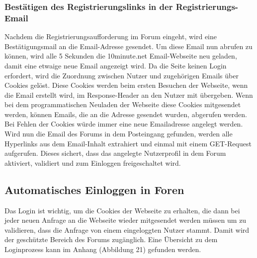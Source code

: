 \subsubsection{Bestätigen des Registrierungslinks in der Registrierungs-Email}
Nachdem die Registrierungsaufforderung im Forum eingeht, wird eine Bestätigungsmail an die Email-Adresse gesendet.
Um diese Email nun abrufen zu können, wird alle 5 Sekunden die 10minute.net Email-Webseite neu geladen, damit eine etwaige neue Email angezeigt wird. Da die Seite keinen Login erfordert, wird die Zuordnung zwischen Nutzer und zugehörigen Emails über Cookies gelöst. Diese Cookies werden beim ersten Besuchen der Webseite, wenn die Email erstellt wird, im Response-Header an den Nutzer mit übergeben. Wenn bei dem programmatischen Neuladen der Webseite diese Cookies mitgesendet werden, können Emails, die an die Adresse gesendet wurden, abgerufen werden. Bei Fehlen der Cookies würde immer eine neue Emailadresse angelegt werden.\\
Wird nun die Email des Forums in dem Posteingang gefunden, werden alle Hyperlinks aus dem Email-Inhalt extrahiert und einmal mit einem GET-Request aufgerufen. Dieses sichert, dass das angelegte Nutzerprofil in dem Forum aktiviert, validiert und zum Einloggen freigeschaltet wird.


\subsection {Automatisches Einloggen in Foren}
Das Login ist wichtig, um die Cookies der Webseite zu erhalten, die dann bei jeder neuen Anfrage an die Webseite wieder mitgesendet werden müssen um zu validieren, dass die Anfrage von einem eingeloggten Nutzer stammt. Damit wird der geschützte Bereich des Forums zugänglich.
Eine Übersicht zu dem Loginprozess kann im Anhang (Abbildung 21) gefunden werden.

